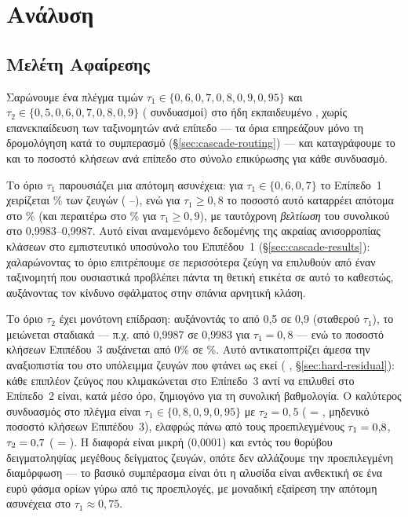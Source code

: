 

\chapter{Ανάλυση}
\label{ch:analysis}


\section{Μελέτη Αφαίρεσης}
\label{sec:ablation}

Σαρώνουμε ένα πλέγμα τιμών $\tau_1 \in \{0{,}6, 0{,}7, 0{,}8, 0{,}9, 0{,}95\}$ και
$\tau_2 \in \{0{,}5, 0{,}6, 0{,}7, 0{,}8, 0{,}9\}$ (\AblGridPoints{} συνδυασμοί) στο ήδη εκπαιδευμένο
, χωρίς επανεκπαίδευση των ταξινομητών ανά επίπεδο --- τα όρια
επηρεάζουν μόνο τη δρομολόγηση κατά το συμπερασμό (\S\ref{sec:cascade-routing}) --- και
καταγράφουμε το  και το ποσοστό κλήσεων ανά επίπεδο στο σύνολο
επικύρωσης για κάθε συνδυασμό.

Το όριο $\tau_1$ παρουσιάζει μια απότομη ασυνέχεια: για $\tau_1 \in \{0{,}6, 0{,}7\}$
το Επίπεδο~1 χειρίζεται \AblTierOneLowPct\% των ζευγών ( \AblTierOneLowFone{}--\AblTierOneHighFone), ενώ
για $\tau_1 \geq 0{,}8$ το ποσοστό αυτό καταρρέει απότομα στο \AblTierOneBreakPct\% (και περαιτέρω
στο \AblTierOneBreakPctHigh\% για $\tau_1 \geq 0{,}9$), με ταυτόχρονη \textit{βελτίωση} του συνολικού
 στο 0{,}9983--0{,}9987.
Αυτό είναι αναμενόμενο δεδομένης της ακραίας
ανισορροπίας κλάσεων στο εμπιστευτικό υποσύνολο του Επιπέδου~1
(\S\ref{sec:cascade-results}): χαλαρώνοντας το όριο επιτρέπουμε σε περισσότερα ζεύγη
να επιλυθούν από έναν ταξινομητή που ουσιαστικά προβλέπει πάντα τη θετική ετικέτα σε
αυτό το καθεστώς, αυξάνοντας τον κίνδυνο σφάλματος στην σπάνια αρνητική κλάση.

Το όριο $\tau_2$ έχει μονότονη επίδραση: αυξάνοντάς το από 0{,}5 σε 0{,}9 (σταθερού
$\tau_1$), το  μειώνεται σταδιακά --- π.χ. από 0{,}9987 σε 0{,}9983 για
$\tau_1 = 0{,}8$ --- ενώ το ποσοστό κλήσεων Επιπέδου~3 αυξάνεται από 0\% σε \AblTauTwoMaxTierThreePct\%.
Αυτό αντικατοπτρίζει άμεσα την αναξιοπιστία του \texttt{} στο
υπόλειμμα ζευγών που φτάνει ως εκεί ( \TierThreeFone, \S\ref{sec:hard-residual}):
κάθε επιπλέον ζεύγος που κλιμακώνεται στο Επίπεδο~3 αντί να επιλυθεί στο Επίπεδο~2
είναι, κατά μέσο όρο, ζημιογόνο για τη συνολική βαθμολογία.
Ο καλύτερος συνδυασμός στο
πλέγμα είναι $\tau_1 \in \{0{,}8, 0{,}9, 0{,}95\}$ με $\tau_2 = 0{,}5$
( = \AblBestFone{}, μηδενικό ποσοστό κλήσεων Επιπέδου~3), ελαφρώς πάνω από τους
προεπιλεγμένους $\tau_1 = 0{,}8$, $\tau_2 = 0{,}7$ ( = \AblDefaultFone{}). Η
διαφορά είναι μικρή (0{,}0001) και εντός του θορύβου δειγματοληψίας μεγέθους δείγματος
\ValSplitSize{} ζευγών, οπότε δεν αλλάζουμε την προεπιλεγμένη διαμόρφωση --- το βασικό
συμπέρασμα είναι ότι η αλυσίδα είναι ανθεκτική σε ένα ευρύ φάσμα ορίων γύρω από τις
προεπιλογές, με μοναδική εξαίρεση την απότομη ασυνέχεια στο $\tau_1 \approx 0{,}75$.

